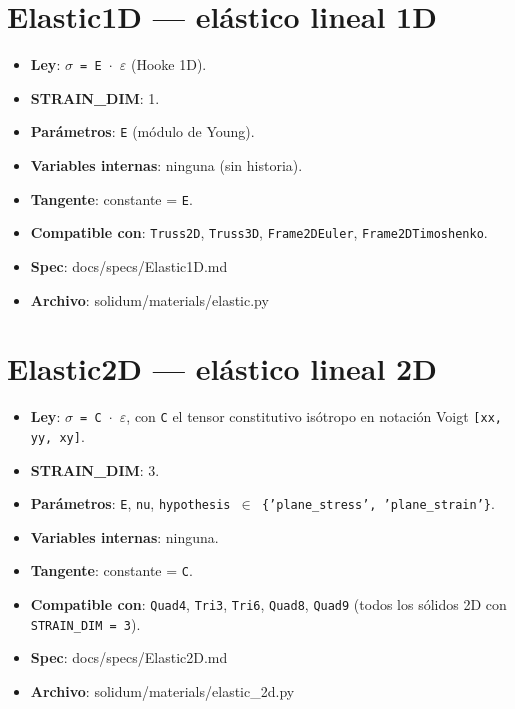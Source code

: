 \documentclass[11pt,letterpaper,oneside]{report}
\begin{document}
\section{Elastic1D --- elástico lineal 1D}

\begin{itemize}
  \item \textbf{Ley}: \texttt{\ensuremath{\sigma} = E \ensuremath{\cdot} \ensuremath{\varepsilon}} (Hooke 1D).
  \item \textbf{STRAIN\_DIM}: 1.
  \item \textbf{Parámetros}: \texttt{E} (módulo de Young).
  \item \textbf{Variables internas}: ninguna (sin historia).
  \item \textbf{Tangente}: constante = \texttt{E}.
  \item \textbf{Compatible con}: \texttt{Truss2D}, \texttt{Truss3D}, \texttt{Frame2DEuler}, \texttt{Frame2DTimoshenko}.
  \item \textbf{Spec}: docs/specs/Elastic1D.md
  \item \textbf{Archivo}: solidum/materials/elastic.py
\end{itemize}


\section{Elastic2D --- elástico lineal 2D}

\begin{itemize}
  \item \textbf{Ley}: \texttt{\ensuremath{\sigma} = C \ensuremath{\cdot} \ensuremath{\varepsilon}}, con \texttt{C} el tensor constitutivo isótropo en notación Voigt \texttt{[xx, yy, xy]}.
  \item \textbf{STRAIN\_DIM}: 3.
  \item \textbf{Parámetros}: \texttt{E}, \texttt{nu}, \texttt{hypothesis \ensuremath{\in} \{'plane\_stress', 'plane\_strain'\}}.
  \item \textbf{Variables internas}: ninguna.
  \item \textbf{Tangente}: constante = \texttt{C}.
  \item \textbf{Compatible con}: \texttt{Quad4}, \texttt{Tri3}, \texttt{Tri6}, \texttt{Quad8}, \texttt{Quad9} (todos los sólidos 2D con \texttt{STRAIN\_DIM = 3}).
  \item \textbf{Spec}: docs/specs/Elastic2D.md
  \item \textbf{Archivo}: solidum/materials/elastic\_2d.py
\end{itemize}
\end{document}
